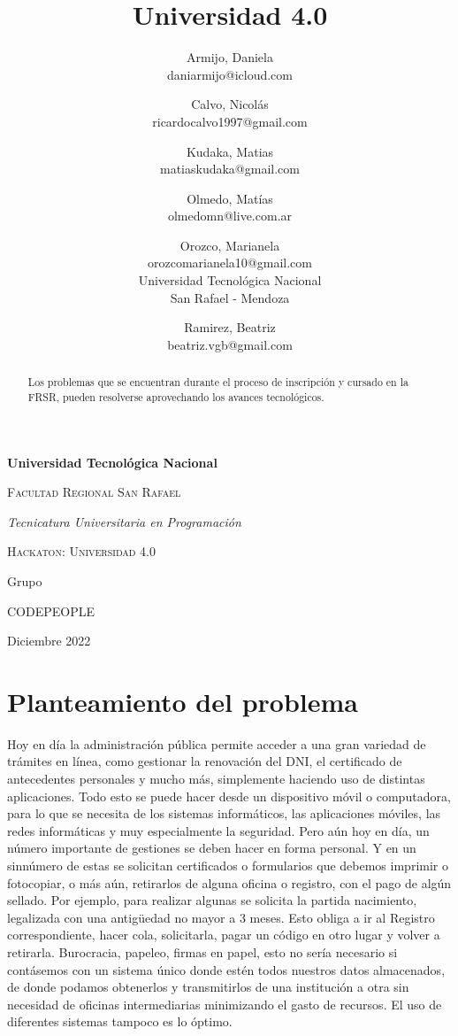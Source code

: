 \documentclass[a4paper]{article}
\title{Universidad 4.0}
\author{Armijo, Daniela\\
  \small daniarmijo@icloud.com
  \and
  Calvo, Nicolás\\
  \small ricardocalvo1997@gmail.com
  \and
  Kudaka, Matias\\
  \small matiaskudaka@gmail.com
  \and
  Olmedo, Matías\\
  \small olmedomn@live.com.ar
  \and
  Orozco, Marianela\\
  \small orozcomarianela10@gmail.com\\
  \small Universidad Tecnológica Nacional\\
  \small San Rafael - Mendoza
  \and
  Ramirez, Beatriz\\
  \small beatriz.vgb@gmail.com\\
  \date{}
}
\begin{document}
\begin{titlepage}
\centering
{\bfseries\LARGE Universidad Tecnológica Nacional \par}
\vspace{1cm}
{\scshape\Large Facultad Regional San Rafael\par}
\vspace{3cm}
{\itshape\Large Tecnicatura Universitaria en Programación \par}
\vspace{3cm}
{\scshape\Huge Hackaton: Universidad 4.0 \par}
\vfill
{\Large Grupo \par}
{\Large CODEPEOPLE \par}
\vfill
{\Large Diciembre 2022 \par}
\end{titlepage}

\maketitle

\begin{abstract}
Los problemas que se encuentran durante el proceso de inscripción y cursado en la FRSR, pueden resolverse aprovechando los avances tecnológicos.
\end{abstract}

\section{Planteamiento del problema}

Hoy en día la administración pública permite acceder a una gran variedad de trámites en línea, como gestionar la renovación del DNI, el certificado de antecedentes personales y mucho más, simplemente haciendo uso de distintas aplicaciones. Todo esto se puede hacer desde un dispositivo móvil o computadora, para lo que se necesita de los sistemas informáticos, las aplicaciones móviles, las redes informáticas y muy especialmente la seguridad. Pero aún hoy en día, un número importante de gestiones se deben hacer en forma personal. Y en un sinnúmero de estas se solicitan certificados o formularios que debemos imprimir o fotocopiar, o más aún, retirarlos de alguna oficina o registro, con el pago de algún sellado. Por ejemplo, para realizar algunas se solicita la partida nacimiento, legalizada con una antigüedad no mayor a 3 meses. Esto obliga a ir al Registro correspondiente, hacer cola, solicitarla, pagar un código en otro lugar y volver a retirarla. Burocracia, papeleo, firmas en papel, esto no sería necesario si contásemos con un sistema único donde estén todos nuestros datos almacenados, de donde podamos obtenerlos y transmitirlos de una institución a otra sin necesidad de oficinas intermediarias minimizando el gasto de recursos. El uso de diferentes sistemas tampoco es lo óptimo. 
\end{document}
